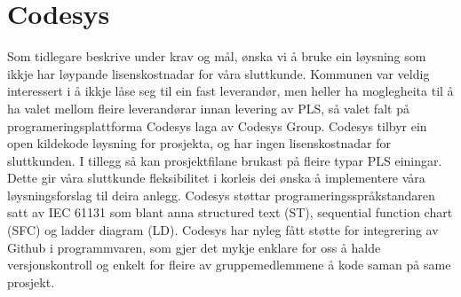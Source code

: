 \section{Codesys}
\thispagestyle{fancy}
Som tidlegare beskrive under krav og mål, ønska vi å bruke ein løysning som ikkje har løypande lisenskostnadar for våra sluttkunde. 
Kommunen var veldig interessert i å ikkje låse seg til ein fast leverandør, men heller ha moglegheita til å ha valet mellom fleire leverandørar innan levering av PLS, så valet falt på programeringsplattforma Codesys\citep{Codesys} laga av Codesys Group. 
Codesys tilbyr ein open kildekode løysning for prosjekta, og har ingen lisenskostnadar for sluttkunden. 
I tillegg så kan prosjektfilane brukast på fleire typar PLS einingar. 
Dette gir våra sluttkunde fleksibilitet i korleis dei ønska å implementere våra løysningsforslag til deira anlegg.
Codesys støttar programeringsspråkstandaren satt av IEC 61131 som blant anna structured text (ST), sequential function chart (SFC) og ladder diagram (LD). 
Codesys har nyleg fått støtte for integrering av Github i programmvaren, som gjer det mykje enklare for oss å halde versjonskontroll og enkelt for fleire av gruppemedlemmene å kode saman på same prosjekt.
